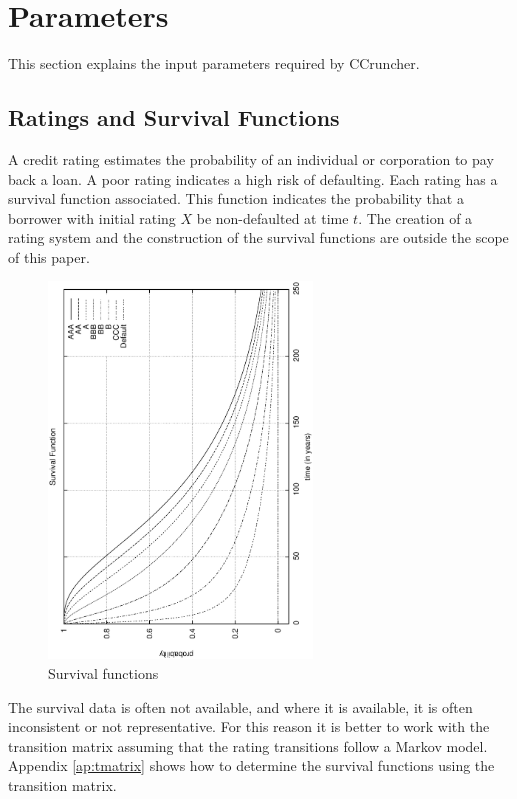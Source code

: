 \documentclass[a4paper,12pt,final]{article}
\begin{document}
\section{Parameters}

This section explains the input parameters required by CCruncher.

\subsection{Ratings and Survival Functions}
A credit rating estimates the probability of an individual or corporation 
to pay back a loan. A poor rating indicates a high risk of defaulting.
Each rating has a survival function associated. This function indicates 
the probability that a borrower with initial rating $X$ be non-defaulted at 
time $t$. The creation of a rating system and the construction of the 
survival functions are outside the scope of this paper.

\begin{figure}[!hbt]
\begin{center}
\includegraphics[height=10cm, angle=-90]{./images/survival.ps}
\caption{Survival functions}
\label{survival}
\end{center}
\end{figure}
\FloatBarrier

The survival data is often not available, and where it is available, it is 
often inconsistent or not representative. For this reason it is better to work 
with the transition matrix assuming that the rating transitions follow a Markov 
model. Appendix \ref{ap:tmatrix} shows how to determine the survival functions 
using the transition matrix.
\end{document}
